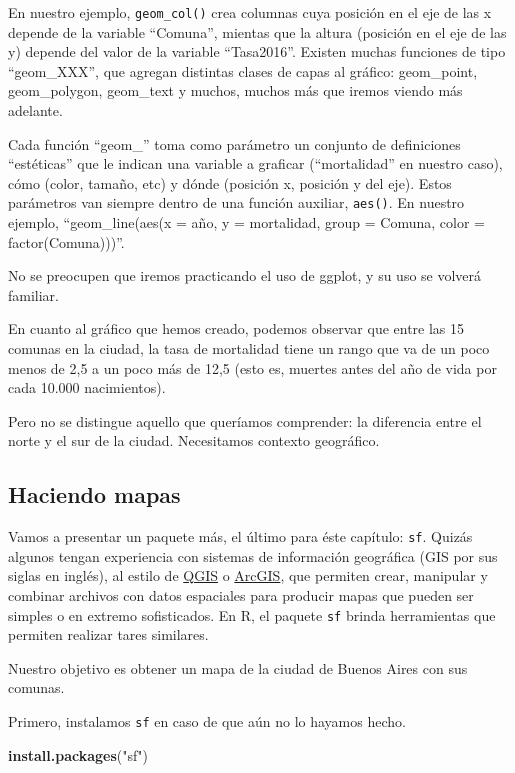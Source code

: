 \documentclass[]{book}
\newenvironment{Shaded}{\begin{snugshade}}{\end{snugshade}}
\newcommand{\KeywordTok}[1]{\textcolor[rgb]{0.13,0.29,0.53}{\textbf{#1}}}
\newcommand{\StringTok}[1]{\textcolor[rgb]{0.31,0.60,0.02}{#1}}
\newcommand{\NormalTok}[1]{#1}
\begin{document}
En nuestro ejemplo, \texttt{geom\_col()} crea columnas cuya posición en
el eje de las x depende de la variable ``Comuna'', mientas que la altura
(posición en el eje de las y) depende del valor de la variable
``Tasa2016''. Existen muchas funciones de tipo ``geom\_XXX'', que
agregan distintas clases de capas al gráfico: geom\_point,
geom\_polygon, geom\_text y muchos, muchos más que iremos viendo más
adelante.

Cada función ``geom\_'' toma como parámetro un conjunto de definiciones
``estéticas'' que le indican una variable a graficar (``mortalidad'' en
nuestro caso), cómo (color, tamaño, etc) y dónde (posición x, posición y
del eje). Estos parámetros van siempre dentro de una función auxiliar,
\texttt{aes()}. En nuestro ejemplo, ``geom\_line(aes(x = año, y =
mortalidad, group = Comuna, color = factor(Comuna)))''.

No se preocupen que iremos practicando el uso de ggplot, y su uso se
volverá familiar.

En cuanto al gráfico que hemos creado, podemos observar que entre las 15
comunas en la ciudad, la tasa de mortalidad tiene un rango que va de un
poco menos de 2,5 a un poco más de 12,5 (esto es, muertes antes del año
de vida por cada 10.000 nacimientos).

Pero no se distingue aquello que queríamos comprender: la diferencia
entre el norte y el sur de la ciudad. Necesitamos contexto geográfico.

\subsection{Haciendo mapas}\label{haciendo-mapas}

Vamos a presentar un paquete más, el último para éste capítulo:
\texttt{sf}. Quizás algunos tengan experiencia con sistemas de
información geográfica (GIS por sus siglas en inglés), al estilo de
\href{https://qgis.org/en/site/}{QGIS} o
\href{https://www.arcgis.com/features/index.html}{ArcGIS}, que permiten
crear, manipular y combinar archivos con datos espaciales para producir
mapas que pueden ser simples o en extremo sofisticados. En R, el paquete
\texttt{sf} brinda herramientas que permiten realizar tares similares.

Nuestro objetivo es obtener un mapa de la ciudad de Buenos Aires con sus
comunas.

Primero, instalamos \texttt{sf} en caso de que aún no lo hayamos hecho.

\begin{Shaded}
\begin{Highlighting}[]
\KeywordTok{install.packages}\NormalTok{(}\StringTok{"sf"}\NormalTok{)}
\end{Highlighting}
\end{Shaded}
\end{document}
